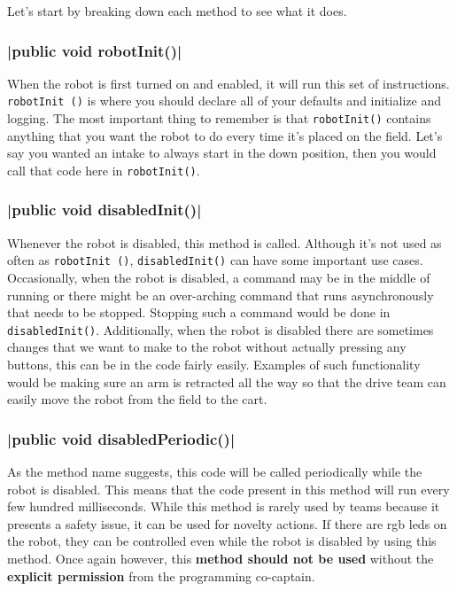 \documentclass[11pt,fleqn]{article}
\begin{document}
Let's start by breaking down each method to see what it does. 

\subsubsection{|public void robotInit()|}
When the robot is first turned on and enabled, it will run this set of instructions. \texttt{robotInit
()} is where you should declare all of your defaults and initialize and logging. The most important thing
to remember is that \texttt{robotInit()} contains anything that you want the robot to do every time it's
placed on the field. Let's say you wanted an intake to always start in the down position, then you would
call that code here in \texttt{robotInit()}.

\subsubsection{|public void disabledInit()|}
Whenever the robot is disabled, this method is called. Although it's not used as often as \texttt{robotInit
()}, \texttt{disabledInit()} can have some important use cases. Occasionally, when the robot is disabled,
a command may be in the middle of running or there might be an over-arching command that runs asynchronously
that needs to be stopped. Stopping such a command would be done in \texttt{disabledInit()}. Additionally,
when the robot is disabled there are sometimes changes that we want to make to the robot without actually
pressing any buttons, this can be in the code fairly easily. Examples of such functionality would be making
sure an arm is retracted all the way so that the drive team can easily move the robot from the field to
the cart. 

\subsubsection{|public void disabledPeriodic()|}
As the method name suggests, this code will be called periodically while the robot is disabled. This means
that the code present in this method will run every few hundred milliseconds. While this method is rarely
used by teams because it presents a safety issue, it can be used for novelty actions. If there are rgb
leds on the robot, they can be controlled even while the robot is disabled by using this method. Once
again however, this \textbf{method should not be used} without the \textbf{explicit permission}
from the programming co-captain. 
\end{document}
